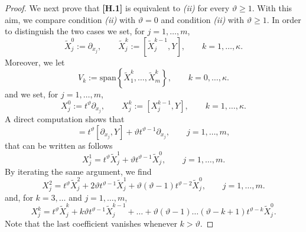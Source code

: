 \documentclass{amsart}
\numberwithin{equation}{section}
\begin{document}
{\begin{proof}
\medskip

We next prove that {\rm \bf[H.1]} is equivalent to {\it (ii)} for every $\vartheta \ge 1$. With this aim, we compare condition {\it (ii)} with $\vartheta = 0$ and condition {\it (ii)} with $\vartheta \ge 1$. In order to distinguish the two cases we set, for $j=1, \dots, m$,
\begin{equation*}
	\widetilde X^0_j := \partial_{x_j}, \qquad \widetilde X^k_j := [ \widetilde X^{k-1}_j, Y ], \qquad k = 1, \dots, \kappa. 
\end{equation*}
Moreover, we let
\begin{equation*} %
	V_k := \text{span} \left\{ \widetilde X^k_1, \dots, \widetilde X^k_m \right\}, \qquad k=0, \dots, \kappa.
\end{equation*}
and we set, for $j=1, \dots, m$,
\begin{equation*}
	X^0_j := t^\vartheta \partial_{x_j}, \qquad  X^k_j := [ X^{k-1}_j, Y ], \qquad k = 1, \dots, \kappa. 
\end{equation*}
A direct computation shows that
\begin{equation*} 
	[ t^\vartheta \partial_{x_j}, Y ] = t^\vartheta [  \partial_{x_j}, Y ] + \vartheta t^{\vartheta-1} \partial_{x_j},
	\qquad j=1, \dots, m,
\end{equation*}
that can be written as follows
\begin{equation*} %
	X_j^1 = t^\vartheta \widetilde X_j^1 + \vartheta t^{\vartheta-1} \widetilde X_j^0, \qquad j=1, \dots, m.
\end{equation*}
By iterating the same argument, we find
\begin{equation} \label{eq-X2}
	X_j^2 = t^\vartheta \widetilde X_j^2 + 2 \vartheta t^{\vartheta-1} \widetilde X_j^1 + 
	\vartheta (\vartheta-1) t^{\vartheta-2} \widetilde X_j^0, \qquad j=1, \dots, m.
\end{equation}
and, for $k = 3, \dots$ and $j=1, \dots, m$, 
\begin{equation} \label{eq-Xk}
	X_j^k = t^\vartheta \widetilde X_j^k + k \vartheta t^{\vartheta-1} \widetilde X_j^{k-1} + \dots + 
	\vartheta (\vartheta-1) \dots (\vartheta - k + 1)  t^{\vartheta-k} \widetilde X_j^0.
\end{equation}
Note that the last coefficient vanishes whenever $k > \vartheta$.
	

\end{proof}}
\end{document}
